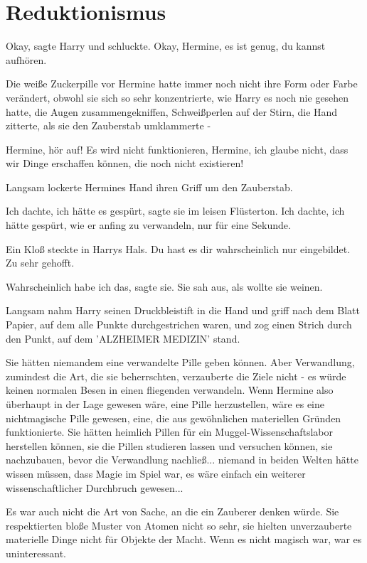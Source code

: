 \chapter{Reduktionismus}

\glqq{}Okay\grqq{}, sagte Harry und schluckte. \glqq{}Okay, Hermine, es ist
genug, du kannst aufhören.\grqq{}

Die weiße Zuckerpille vor Hermine hatte immer noch nicht ihre Form oder Farbe
verändert, obwohl sie sich so sehr konzentrierte, wie Harry es noch nie gesehen
hatte, die Augen zusammengekniffen, Schweißperlen auf der Stirn, die Hand
zitterte, als sie den Zauberstab umklammerte -

\glqq{}Hermine, hör auf! Es wird nicht funktionieren, Hermine, ich glaube nicht,
dass wir Dinge erschaffen können, die noch nicht existieren!\grqq{}

Langsam lockerte Hermines Hand ihren Griff um den Zauberstab.

\glqq{}Ich dachte, ich hätte es gespürt\grqq{}, sagte sie im leisen Flüsterton.
\glqq{}Ich dachte, ich hätte gespürt, wie er anfing zu verwandeln, nur für eine
Sekunde.\grqq{}

Ein Kloß steckte in Harrys Hals. \glqq{}Du hast es dir wahrscheinlich nur
eingebildet. Zu sehr gehofft.\grqq{}

\glqq{}Wahrscheinlich habe ich das\grqq{}, sagte sie. Sie sah aus, als wollte
sie weinen.

Langsam nahm Harry seinen Druckbleistift in die Hand und griff nach dem Blatt
Papier, auf dem alle Punkte durchgestrichen waren, und zog einen Strich durch
den Punkt, auf dem 'ALZHEIMER MEDIZIN' stand.

Sie hätten niemandem eine verwandelte Pille geben können. Aber Verwandlung,
zumindest die Art, die sie beherrschten, verzauberte die Ziele nicht - es würde
keinen normalen Besen in einen fliegenden verwandeln. Wenn Hermine also
überhaupt in der Lage gewesen wäre, eine Pille herzustellen, wäre es eine
nichtmagische Pille gewesen, eine, die aus gewöhnlichen materiellen Gründen
funktionierte. Sie hätten heimlich Pillen für ein Muggel-Wissenschaftslabor
herstellen können, sie die Pillen studieren lassen und versuchen können, sie
nachzubauen, bevor die Verwandlung nachließ... niemand in beiden Welten hätte
wissen müssen, dass Magie im Spiel war, es wäre einfach ein weiterer
wissenschaftlicher Durchbruch gewesen...

Es war auch nicht die Art von Sache, an die ein Zauberer denken würde. Sie
respektierten bloße Muster von Atomen nicht so sehr, sie hielten unverzauberte
materielle Dinge nicht für Objekte der Macht. Wenn es nicht magisch war, war es
uninteressant.

